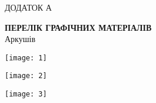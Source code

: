 \documentclass[main.tex]{subfiles}
\begin{document}
\renewcommand\stamppartname{Перелік графічних матеріалів}

\begin{specialpage}
  \MakeUppercase{Додаток А}\\
  \MakeUppercase{\stampname{}}

  \vspace*{\fill}
  \textbf{\MakeUppercase{\stamppartname{}}}\\
  Аркушів \pageref{\lastpagelabel{}}

  \vspace*{\fill}
  \mypagefooter{}
\end{specialpage}

\pagestyle{plain}

\renewcommand\stamppartname{Діаграма варіантів використання}
\begin{center}
\noindent\texttt{[image: 1]}
\end{center}
\newpage

\renewcommand\stampcode{ІАЛЦ.467100.005 Д2}
\renewcommand\stamppartname{Схема програми}
\begin{center}
\noindent\texttt{[image: 2]}
\end{center}
%
\newpage
\renewcommand\stampcode{ІАЛЦ.467100.006 Д3}
\renewcommand\stamppartname{Схема системи}
\begin{center}
\noindent\texttt{[image: 3]}
\end{center}

\finalizepart{}
\end{document}
